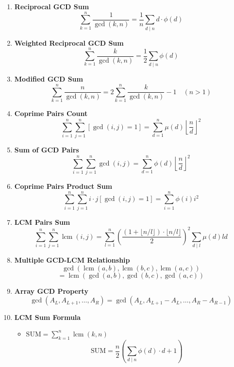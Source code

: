 \begin{enumerate}[leftmargin=*]
    \item \textbf{Reciprocal GCD Sum}
        \[\sum_{k=1}^n \frac{1}{\gcd(k, n)} = \frac{1}{n} \sum_{d \mid n} d \cdot \phi(d)\]
    
    \item \textbf{Weighted Reciprocal GCD Sum}
        \[\sum_{k=1}^n \frac{k}{\gcd(k, n)} = \frac{1}{2} \sum_{d \mid n} \phi(d)\]
    
    \item \textbf{Modified GCD Sum}
        \[\sum_{k=1}^n \frac{n}{\gcd(k, n)} = 2 \sum_{k=1}^n \frac{k}{\gcd(k, n)} - 1 \quad (n > 1)\]
    
    \item \textbf{Coprime Pairs Count}
        \[\sum_{i=1}^n \sum_{j=1}^n [\gcd(i, j) = 1] = \sum_{d=1}^n \mu(d) \left\lfloor \frac{n}{d} \right\rfloor^2\]
    
    \item \textbf{Sum of GCD Pairs}
        \[\sum_{i=1}^n \sum_{j=1}^n \gcd(i, j) = \sum_{d=1}^n \phi(d) \left\lfloor \frac{n}{d} \right\rfloor^2\]
    
    \item \textbf{Coprime Pairs Product Sum}
        \[\sum_{i=1}^n \sum_{j=1}^n i \cdot j[\gcd(i, j) = 1] = \sum_{i=1}^n \phi(i)i^2\]
    
    \item \textbf{LCM Pairs Sum}
        \[\sum_{i=1}^n \sum_{j=1}^n \operatorname{lcm}(i, j) = \sum_{l=1}^n \left(\frac{(1 + \lfloor n/l \rfloor) \cdot \lfloor n/l \rfloor}{2} \right)^2 \sum_{d \mid l} \mu(d)ld\]
    
    \item \textbf{Multiple GCD-LCM Relationship}
        \[\gcd(\operatorname{lcm}(a, b), \operatorname{lcm}(b, c), \operatorname{lcm}(a, c))\]
        \[= \operatorname{lcm}(\gcd(a, b), \gcd(b, c), \gcd(a, c))\]
    
    \item \textbf{Array GCD Property}
        \[\gcd(A_L, A_{L+1}, \ldots, A_R) = \gcd(A_L, A_{L+1} - A_L, \ldots, A_R - A_{R-1})\]
    
    \item \textbf{LCM Sum Formula}
        \begin{itemize}
            \item $\text{SUM} = \sum_{k=1}^n \operatorname{lcm}(k,n)$
            \[\text{SUM} = \frac{n}{2} \left( \sum_{d \mid n} \phi(d) \cdot d + 1 \right)\]
        \end{itemize}
\end{enumerate}